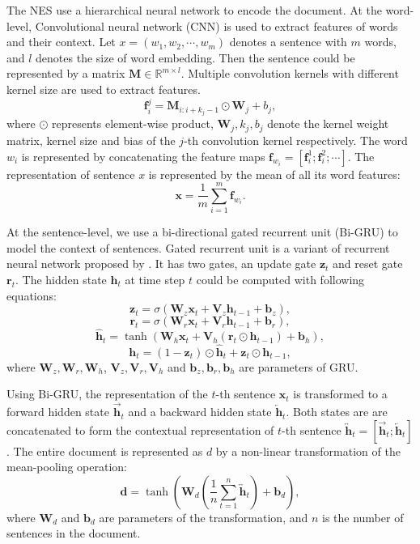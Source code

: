 \documentclass[letterpaper]{article} %
\begin{document}
	
	The NES use a hierarchical neural network to encode the document. At the word-level, Convolutional neural network (CNN) is used to extract features of words and their context. Let $x=(w_1, w_2, \cdots, w_m)$ denotes a sentence with $m$ words, and $l$ denotes the size of word embedding. Then the sentence could be represented by a matrix $\mathbf{M} \in \mathbb{R}^{m \times l}$. Multiple convolution kernels with different kernel size are used to extract features.
	$$\mathbf{f}_i^j = \mathbf{M}_{i:i+k_j-1} \odot \mathbf{W}_j + b_j ,$$
	where $\odot$ represents element-wise product, $\mathbf{W}_j, k_j, b_j$ denote the kernel weight matrix, kernel size and bias of the $j$-th convolution kernel respectively. The word $w_i$ is represented by concatenating the feature maps $\mathbf{f}_{w_i}=[\mathbf{f}_i^1 ; \mathbf{f}_i^2 ; \cdots]$. The representation of sentence $x$ is represented by the mean of all its word features:
	$$ \mathbf{x} = \frac{1}{m} \sum_{i=1}^m \mathbf{f}_{w_i} .$$
	
	At the sentence-level, we use a bi-directional gated recurrent unit (Bi-GRU) to model the context of sentences. Gated recurrent unit is a variant of recurrent neural network proposed by \cite{chung2014empirical}. It has two gates, an update gate $\mathbf{z}_t$ and reset gate $\mathbf{r}_t$. The hidden state $\mathbf{h}_t$ at time step $t$ could be computed with following equations:
	\[ \mathbf{z}_t = \sigma(\mathbf{W}_{z} \mathbf{x}_t + \mathbf{V}_{z} \mathbf{h}_{t-1}  + \mathbf{b}_{z}) , \]
	\[ \mathbf{r}_t = \sigma(\mathbf{W}_{r} \mathbf{x}_t + \mathbf{V}_{r} \mathbf{h}_{t-1}  + \mathbf{b}_{r}) , \]
	\[ \hat{\mathbf{h}}_t = \tanh(\mathbf{W}_{h} \mathbf{x}_t + \mathbf{V}_{h} (\mathbf{r}_{t} \odot \mathbf{h}_{t-1} ) + \mathbf{b}_{h} ) ,\]
	\[ \mathbf{h}_t = (1 - \mathbf{z}_t) \odot \hat{\mathbf{h}}_{t} +  \mathbf{z}_t \odot \mathbf{h}_{t-1} ,\]
	where $\mathbf{W}_{z},\mathbf{W}_{r},\mathbf{W}_{h}$, $\mathbf{V}_{z},\mathbf{V}_{r},\mathbf{V}_{h}$ and $\mathbf{b}_{z},\mathbf{b}_{r},\mathbf{b}_{h}$ are parameters of GRU. 
	
	Using Bi-GRU, the representation of the $t$-th sentence $\mathbf{x}_t$ is transformed to a forward hidden state $\overrightarrow{\mathbf{h}}_t$ and a backward hidden state $\overleftarrow{\mathbf{h}}_t$. Both states are are concatenated to form the contextual representation of $t$-th sentence $\overleftrightarrow{\mathbf{h}}_t = [\overrightarrow{\mathbf{h}}_t ; \overleftarrow{\mathbf{h}}_t]$. The entire document is represented as $d$ by a non-linear transformation of the mean-pooling operation:
	\[ \mathbf{d} = \tanh( \mathbf{W}_d (\frac{1}{n} \sum_{t=1}^{n} \overleftrightarrow{\mathbf{h}}_t ) + \mathbf{b}_d ) ,\]
	where $\mathbf{W}_d$ and $\mathbf{b}_d$ are parameters of the transformation, and $n$ is the number of sentences in the document. 
	
\end{document}
